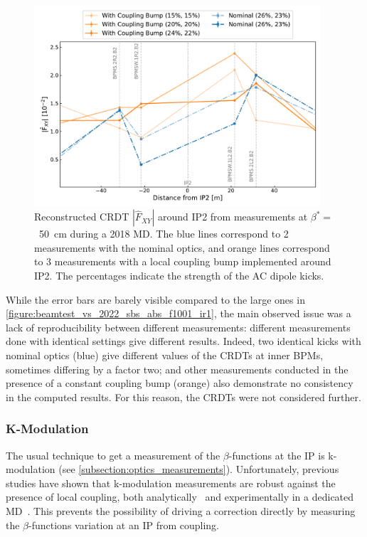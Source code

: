 \begin{figure}[!htb]
    \centering
    \includegraphics*[width=0.95\textwidth]{Figures/IR_Coupling_Correction/crdt_fxy_nominal_vs_colin_md_2018.pdf}
    \caption{Reconstructed CRDT \(|\hat{F}_{XY}|\) around IP\num{2} from measurements at \(\beta^{\ast} =\)~\qty{50}{\centi\meter} during a \num{2018} MD. The \textcolor{mplblue}{blue} lines correspond to \num{2} measurements with the nominal optics, and \textcolor{mplorange}{orange} lines correspond to \num{3} measurements with a local coupling bump implemented around IP\num{2}. The percentages indicate the strength of the AC dipole kicks.}
    \label{figure:crdt_fxy_nominal_vs_colin_md_2018}
\end{figure}

While the error bars are barely visible compared to the large ones in \cref{figure:beamtest_vs_2022_sbs_abs_f1001_ir1}, the main observed issue was a lack of reproducibility between different measurements: different measurements done with identical settings give different results.
Indeed, two identical kicks with nominal optics (\textcolor{mplblue}{blue}) give different values of the CRDTs at inner BPMs, sometimes differing by a factor two; and other measurements conducted in the presence of a constant coupling bump (\textcolor{mplorange}{orange}) also demonstrate no consistency in the computed results.
For this reason, the CRDTs were not considered further.

\subsubsection*{K-Modulation}

The usual technique to get a measurement of the \(\beta\)-functions at the IP is k-modulation (see \cref{subsection:optics_measurements}).
Unfortunately, previous studies have shown that k-modulation measurements are robust against the presence of local coupling, both analytically~\cite{PRAB:Hofer:Coupling_Local_Observables, PRAB:Carlier:KModulation_HiLumi} and experimentally in a dedicated \gls{MD}~\cite{CERN:Persson:Local_Coupling_IP}.
This prevents the possibility of driving a correction directly by measuring the \(\beta\)-functions variation at an IP from coupling. 


